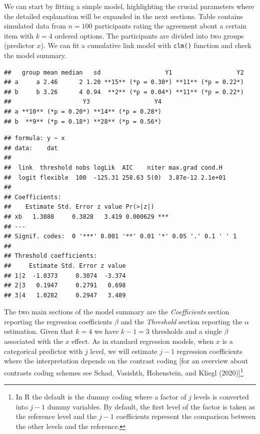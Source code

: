 \documentclass[
  man,floatsintext]{apa6}
\begin{document}
We can start by fitting a simple model, highlighting the crucial parameters where the detailed explanation will be expanded in the next sections. Table contains simulated data from \(n = 100\) participants rating the agreement about a certain item with \(k = 4\) ordered options. The participants are divided into two groups (predictor \(x\)). We can fit a cumulative link model with \texttt{clm()} function and check the model summary.

\scriptsize

\begin{verbatim}
##   group mean median   sd                  Y1                  Y2
## a     a 2.46      2 1.20 **15** (*p = 0.30*) **11** (*p = 0.22*)
## b     b 3.26      4 0.94  **2** (*p = 0.04*) **11** (*p = 0.22*)
##                    Y3                  Y4
## a **10** (*p = 0.20*) **14** (*p = 0.28*)
## b  **9** (*p = 0.18*) **28** (*p = 0.56*)
\end{verbatim}

\normalsize

\scriptsize

\normalsize

\scriptsize

\begin{verbatim}
## formula: y ~ x
## data:    dat
## 
##  link  threshold nobs logLik  AIC    niter max.grad cond.H 
##  logit flexible  100  -125.31 258.63 5(0)  3.87e-12 2.1e+01
## 
## Coefficients:
##    Estimate Std. Error z value Pr(>|z|)    
## xb   1.3088     0.3828   3.419 0.000629 ***
## ---
## Signif. codes:  0 '***' 0.001 '**' 0.01 '*' 0.05 '.' 0.1 ' ' 1
## 
## Threshold coefficients:
##     Estimate Std. Error z value
## 1|2  -1.0373     0.3074  -3.374
## 2|3   0.1947     0.2791   0.698
## 3|4   1.0282     0.2947   3.489
\end{verbatim}

\normalsize

The two main sections of the model summary are the \emph{Coefficients} section reporting the regression coefficients \(\beta\) and the \emph{Threshold} section reporting the \(\alpha\) estimation. Given that \(k = 4\) we have \(k - 1 = 3\) thresholds and a single \(\beta\) associated with the \(x\) effect. As in standard regression models, when \(x\) is a categorical predictor with \(j\) level, we will estimate \(j - 1\) regression coefficients where the interpretation depends on the contrast coding {[}for an overview about contrasts coding schemes see Schad, Vasishth, Hohenstein, and Kliegl (2020){]}\footnote{In R the default is the dummy coding where a factor of \(j\) levels is converted into \(j - 1\) dummy variables. By default, the first level of the factor is taken as the reference level and the \(j - 1\) coefficients represent the comparison between the other levels and the reference.}
\end{document}
